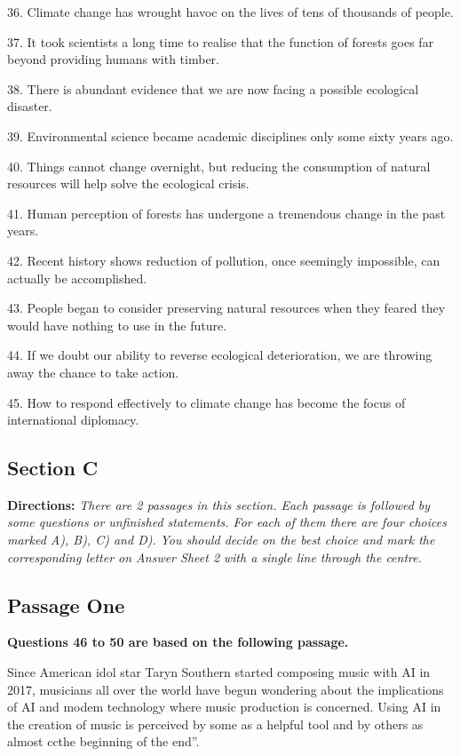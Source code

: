 \documentclass[UTF8,11pt]{ctexart}
\begin{document}
36. Climate change has wrought havoc on the lives of tens of thousands of people.


37. It took scientists a long time to realise that the function of forests goes far beyond providing humans with timber.


38. There is abundant evidence that we are now facing a possible ecological disaster.


39. Environmental science became academic disciplines only some sixty years ago.


40. Things cannot change overnight, but reducing the consumption of natural resources will help solve the ecological crisis.


41. Human perception of forests has undergone a tremendous change in the past years.


42. Recent history shows reduction of pollution, once seemingly impossible, can actually be accomplished.


43. People began to consider preserving natural resources when they feared they would have nothing to use in the future.


44. If we doubt our ability to reverse ecological deterioration, we are throwing away the chance to take action.


45. How to respond effectively to climate change has become the focus of international diplomacy.


\subsection*{\textbf{Section C}}


\textbf{Directions: }\textit{There are 2 passages in this section. Each passage is followed by some questions} \textit{or unfinished statements. For each of them there are four choices marked A), B), C) and D).} \textit{You should decide on the best choice and mark the corresponding letter on Answer Sheet 2} \textit{with a single line through the centre.}


\subsection*{\textbf{Passage One}}


\textbf{Questions 46 to 50 are based on the following passage.}


Since American idol star Taryn Southern started composing music with AI in 2017, musicians all over the world have begun wondering about the implications of AI and modem technology where music production is concerned. Using AI in the creation of music is perceived by some as a helpful tool and by others as almost ccthe beginning of the end”.
\end{document}
